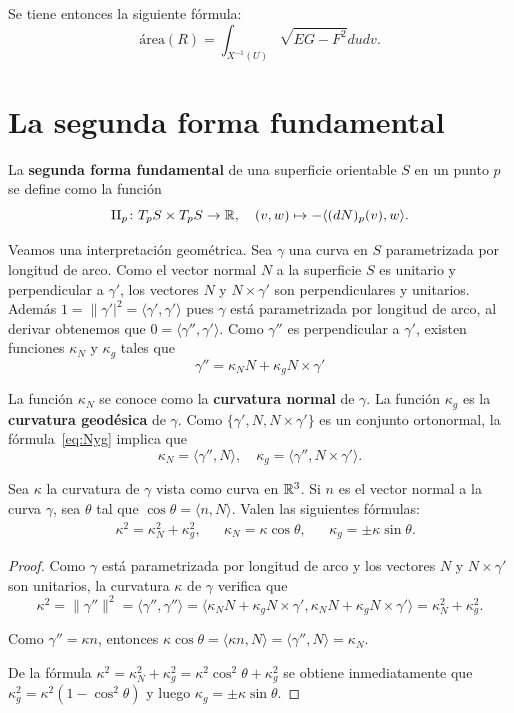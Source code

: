 Se tiene entonces la siguiente fórmula:
\[
	\text{área}(R)=\int_{X^{-1}(U)}\sqrt{EG-F^2}dudv.
\]

\chapter{La segunda forma fundamental} 

La \textbf{segunda forma fundamental} de una superficie orientable $S$ en un
punto $p$ se define como la función
\[
	\operatorname{II}_p\colon T_pS\times T_pS\to\mathbb{R},\quad
	(v,w)\mapsto -\langle (dN)_p(v),w\rangle.
\]

Veamos una interpretación geométrica. Sea $\gamma$ una curva en $S$
parametrizada por longitud de arco. Como el vector normal $N$ a la superficie
$S$ es unitario y perpendicular a $\gamma'$, los vectores $N$ y
$N\times\gamma'$ son perpendiculares y unitarios. Además
$1=\|\gamma'|^2=\langle\gamma',\gamma'\rangle$ pues $\gamma$ está parametrizada
por longitud de arco, al derivar obtenemos que
$0=\langle\gamma'',\gamma'\rangle$. Como $\gamma''$ es perpendicular a
$\gamma'$, existen funciones $\kappa_N$ y $\kappa_g$ tales que
\begin{equation}
	\label{eq:Nyg}
	\gamma''=\kappa_NN+\kappa_gN\times\gamma'
\end{equation}

La función $\kappa_N$ se conoce como la \textbf{curvatura normal} de $\gamma$.
La función  $\kappa_g$ es la \textbf{curvatura geodésica} de $\gamma$.  Como
$\{\gamma',N,N\times\gamma'\}$ es un conjunto ortonormal, la
fórmula~\eqref{eq:Nyg} implica que
\[
	\kappa_N=\langle\gamma'',N\rangle,\quad
	\kappa_g=\langle\gamma'',N\times\gamma'\rangle.
\]

\begin{lemma}
	Sea $\kappa$ la curvatura de $\gamma$ vista como curva en $\mathbb{R}^3$. Si $n$ es el
	vector normal a la curva $\gamma$, sea $\theta$ tal que 
	$\cos\theta=\langle n,N\rangle$. 
	Valen las siguientes fórmulas:
	\begin{align}
		&\kappa^2=\kappa_N^2+\kappa_g^2,&&
		\kappa_N=\kappa\cos\theta, &&
		\kappa_g=\pm\kappa\sin\theta.
	\end{align}
\end{lemma}

\begin{proof}
	Como $\gamma$ está parametrizada por longitud de arco y los vectores $N$ y
	$N\times\gamma'$ son unitarios, la curvatura $\kappa$ de $\gamma$ verifica que 
	\[
		\kappa^2=\|\gamma''\|^2
		=\langle\gamma'',\gamma''\rangle
		=\langle\kappa_NN+\kappa_gN\times\gamma',\kappa_NN+\kappa_gN\times\gamma'\rangle
		=\kappa_N^2+\kappa_g^2.
	\]

	Como $\gamma''=\kappa n$, entonces
	$\kappa\cos\theta=\langle\kappa n,N\rangle=\langle \gamma'',N\rangle=\kappa_N$. 

	De la fórmula 
	$\kappa^2=\kappa_N^2+\kappa_g^2=\kappa^2\cos^2\theta+\kappa_g^2$ se obtiene inmediatamente 
	que $\kappa_g^2=\kappa^2(1-\cos^2\theta)$ y luego 
	$\kappa_g=\pm\kappa\sin\theta$.
\end{proof}

